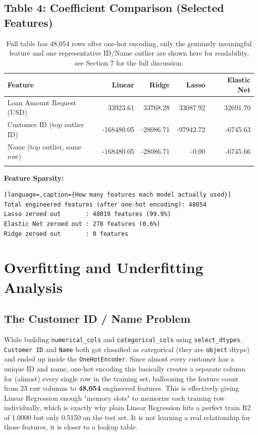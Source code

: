 \documentclass[12pt,a4paper]{article}
\begin{document}
\subsection*{Table 4: Coefficient Comparison (Selected Features)}
\begin{longtable}{p{4.2cm}rrrr}
\toprule
Feature & Linear & Ridge & Lasso & Elastic Net \\
\midrule
Loan Amount Request (USD) & 33923.61 & 33768.28 & 33087.92 & 32691.70 \\
Customer ID (top outlier ID) & -168480.05 & -28086.71 & -97942.72 & -6745.63 \\
Name (top outlier, same row) & -168480.05 & -28086.71 & -0.00 & -6745.66 \\
\bottomrule
\caption{Full table has 48,054 rows after one-hot encoding, only the genuinely meaningful feature and one representative ID/Name outlier are shown here for readability, see Section 7 for the full discussion.}
\end{longtable}

\textbf{Feature Sparsity:}
\begin{lstlisting}[language=,caption={How many features each model actually used}]
Total engineered features (after one-hot encoding): 48054
Lasso zeroed out       : 48019 features (99.9%)
Elastic Net zeroed out : 278 features (0.6%)
Ridge zeroed out       : 0 features
\end{lstlisting}

\section{Overfitting and Underfitting Analysis}

\subsection*{The Customer ID / Name Problem}
While building \texttt{numerical\_cols} and \texttt{categorical\_cols} using \texttt{select\_dtypes}, \texttt{Customer ID} and \texttt{Name} both got classified as categorical (they are \texttt{object} dtype) and ended up inside the \texttt{OneHotEncoder}. Since almost every customer has a unique ID and name, one-hot encoding this basically creates a separate column for (almost) every single row in the training set, ballooning the feature count from 23 raw columns to \textbf{48,054} engineered features. This is effectively giving Linear Regression enough "memory slots" to memorize each training row individually, which is exactly why plain Linear Regression hits a perfect train R2 of 1.0000 but only 0.5150 on the test set. It is not learning a real relationship for those features, it is closer to a lookup table.
\end{document}
